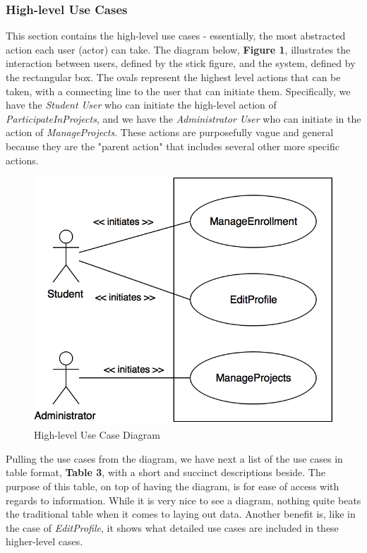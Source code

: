 \documentclass[12pt,letterpaper]{article}
\begin{document}
\subsubsection*{High-level Use Cases}

This section contains the high-level use cases - essentially, the most abstracted action each user (actor) can take. The diagram below, {\bf Figure 1}, illustrates the interaction between
users, defined by the stick figure, and the system, defined by the rectangular box. The ovals represent the highest level actions that can be taken, with a connecting line to
the user that can initiate them. Specifically, we have the {\it Student User} who can initiate the high-level action of {\it ParticipateInProjects}, and we have the {\it Administrator User} who can initiate in the action of {\it ManageProjects}. These actions are purposefully vague and general because they are the "parent action" that includes several other more specific actions.
\vspace{1em}

\begin{figure}[H]
	\centering{}
	\includegraphics[scale=0.3]{imgs/high-level-use-case-diagram.png}
	\caption{High-level Use Case Diagram}
\end{figure}

Pulling the use cases from the diagram, we have next a list of the use cases in table format, {\bf Table 3}, with a short and succinct descriptions beside. The purpose of this table,
on top of having the diagram, is for ease of access with regards to information. While it is very nice to see a diagram, nothing quite beats the traditional table when
it comes to laying out data. Another benefit is, like in the case of {\it EditProfile}, it shows what detailed use cases are included in these higher-level cases.
\end{document}
